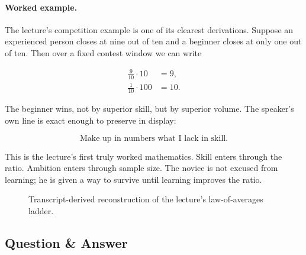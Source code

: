 \paragraph{Worked example.}
The lecture's competition example is one of its clearest derivations. Suppose an experienced person closes at nine out of ten and a beginner closes at only one out of ten. Then over a fixed contest window we can write

\begin{align}
\frac{9}{10}\cdot 10 &= 9, \\
\frac{1}{10}\cdot 100 &= 10.
\end{align}

The beginner wins, not by superior skill, but by superior volume. The speaker's own line is exact enough to preserve in display:

\begin{equation}
\text{Make up in numbers what I lack in skill.}
\end{equation}

This is the lecture's first truly worked mathematics. Skill enters through the ratio. Ambition enters through sample size. The novice is not excused from learning; he is given a way to survive until learning improves the ratio.

\begin{figure}[h]
\centering
{}
\caption{Transcript-derived reconstruction of the lecture's law-of-averages ladder.}
\end{figure}

\subsection{Question \& Answer}

